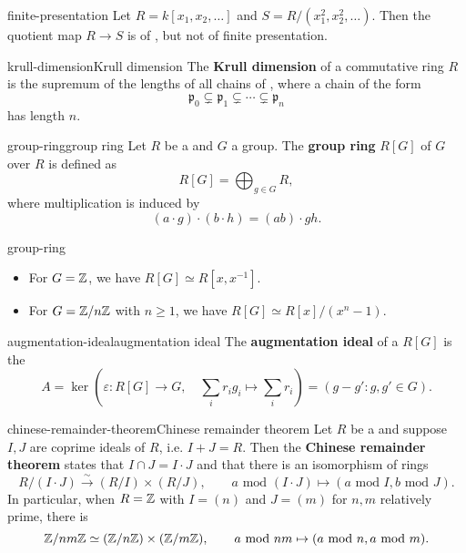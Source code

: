 \begin{example}{finite-presentation}
    Let $R = k[x_1, x_2, \ldots]$ and $S = R / (x_1^2, x_2^2, \ldots)$. Then the quotient map $R \to S$ is of , but not of finite presentation.
\end{example}

\begin{topic}{krull-dimension}{Krull dimension}
    The \textbf{Krull dimension} of a commutative ring $R$ is the supremum of the lengths of all chains of , where a chain of the form
    \[ \mathfrak{p}_0 \subsetneq \mathfrak{p}_1 \subsetneq \cdots \subsetneq \mathfrak{p}_n \]
    has length $n$.
\end{topic}

\begin{topic}{group-ring}{group ring}
    Let $R$ be a  and $G$ a group. The \textbf{group ring} $R[G]$ of $G$ over $R$ is defined as
    \[ R[G] = \bigoplus_{g \in G} R , \]
    where multiplication is induced by
    \[ (a \cdot g) \cdot (b \cdot h) = (ab) \cdot gh . \]
\end{topic}

\begin{example}{group-ring}
    \begin{itemize}
        \item For $G = \mathbb{Z}$, we have $R[G] \simeq R[x, x^{-1}]$.
        \item For $G = \mathbb{Z}/n\mathbb{Z}$ with $n \ge 1$, we have $R[G] \simeq R[x] / (x^n - 1)$.
    \end{itemize}
\end{example}

\begin{topic}{augmentation-ideal}{augmentation ideal}
    The \textbf{augmentation ideal} of a  $R[G]$ is the 
    \[ A = \ker\left( \varepsilon : R[G] \to G, \quad \sum_i r_i g_i \mapsto \sum_i r_i  \right) = (g - g' : g, g' \in G). \]
\end{topic}

\begin{topic}{chinese-remainder-theorem}{Chinese remainder theorem}
    Let $R$ be a  and suppose $I, J$ are coprime ideals of $R$, i.e. $I + J = R$. Then the \textbf{Chinese remainder theorem} states that $I \cap J = I \cdot J$ and that there is an isomorphism of rings
    \[ R / (I \cdot J) \xrightarrow{\sim} (R / I) \times (R/J), \qquad a \text{ mod } (I \cdot J) \mapsto (a \text{ mod } I, b \text{ mod } J) . \]
    In particular, when $R = \mathbb{Z}$ with $I = (n)$ and $J = (m)$ for $n, m$ relatively prime, there is
    \[ \mathbb{Z} / nm \mathbb{Z} \simeq (\mathbb{Z}/n\mathbb{Z}) \times (\mathbb{Z}/m\mathbb{Z}), \qquad a \text{ mod } nm \mapsto (a \text{ mod } n, a \text{ mod } m) . \]
\end{topic}


